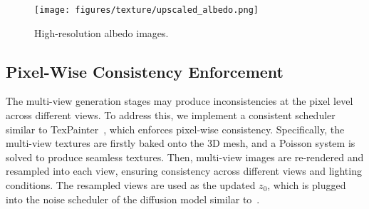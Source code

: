 \begin{figure*}
    \centering 
    \texttt{[image: figures/texture/upscaled\_albedo.png]}
    \caption[High-resolution albedo images]
    {High-resolution albedo images.}
    \label{fig:refined_albedo}
\end{figure*}

\subsection{Pixel-Wise Consistency Enforcement} %
The multi-view generation stages may produce inconsistencies at the pixel level across different views. To address this, we implement a consistent scheduler similar to TexPainter~\cite{zhang2024texpainter}, which enforces pixel-wise consistency. Specifically, the multi-view textures are firstly baked onto the 3D mesh, and a Poisson system is solved to produce seamless textures. Then, multi-view images are re-rendered and resampled into each view, ensuring consistency across different views and lighting conditions. The resampled views are used as the updated $z_0$, which is plugged into the noise scheduler of the diffusion model similar to~\cite{zhang2024texpainter}. %

